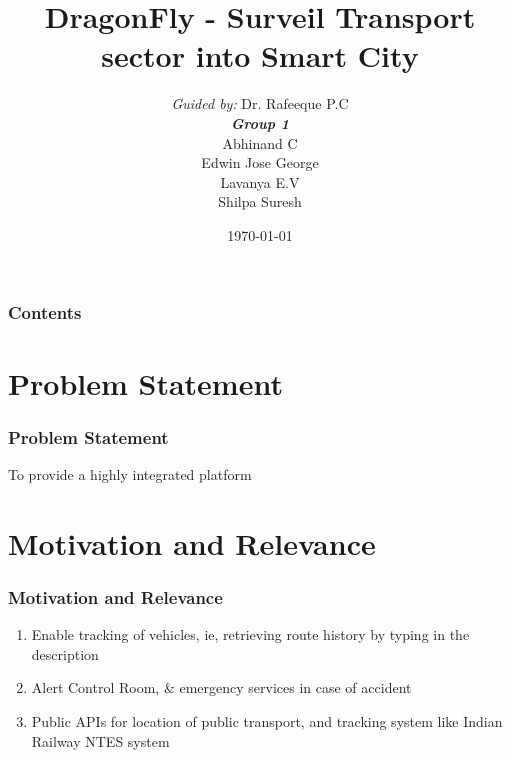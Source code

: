 \documentclass{beamer}
\title[DragonFly]{DragonFly - Surveil Transport sector into Smart City}
\author[Group1]{
	{\small \textit{Guided by:}} Dr. Rafeeque P.C \\
	\medskip
	{\small \textbf{\textit{Group 1}}} \\
	Abhinand C \\
	Edwin Jose George \\
	Lavanya E.V \\
	Shilpa Suresh
}
\institute[GCEK]{Government College of Engineering Kannur}
\date{\today}
\begin{document}
\begin{frame}
\titlepage
\end{frame}

\begin{frame}
\frametitle{Contents}
\tableofcontents
\end{frame}


\section{Problem Statement}
\begin{frame}
	\frametitle{Problem Statement}
	To provide a highly integrated platform 
\end{frame}

\section{Motivation and Relevance}
\begin{frame}
	\frametitle{Motivation and Relevance}
	\begin{enumerate}
		\item Enable tracking of vehicles, ie, retrieving route history by typing in the description
		\item Alert Control Room, \& emergency services in case of accident
		\item Public APIs for location of public transport, and tracking system like Indian Railway NTES system
	\end{enumerate}
\end{frame}


\end{document}

